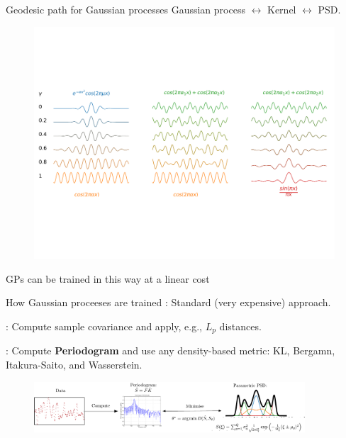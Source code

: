 \documentclass[pdf,aspectratio=169,10pt]{beamer}
\begin{document}
\begin{frame}{Geodesic path for Gaussian processes}
Gaussian process $\leftrightarrow$ Kernel $\leftrightarrow$ PSD.
\begin{figure}
\includegraphics[trim={0 150 0 150},clip,width=1\textwidth]{../img/sinc_gaus_sin2.pdf}
\end{figure}
\centering
{} GPs can be trained in this way at a linear cost
\end{frame}

\begin{frame}[plain]{How Gaussian proceeses are trained}
    \noindent{}: Standard (very expensive) approach.\vspace{2em}


    \noindent{}: Compute sample covariance and apply, e.g., $L_p$ distances.


    \begin{figure} 
            \centering
        \end{figure}

     \noindent{}: Compute \textbf{Periodogram} and use any density-based metric: KL, Bergamn, Itakura-Saito, and Wasserstein. 
    
        \begin{figure} 
            \centering
            \includegraphics[width=0.9\textwidth]{../img/spectral_metric_diag.pdf}
        \end{figure}


\end{frame}
\end{document}

